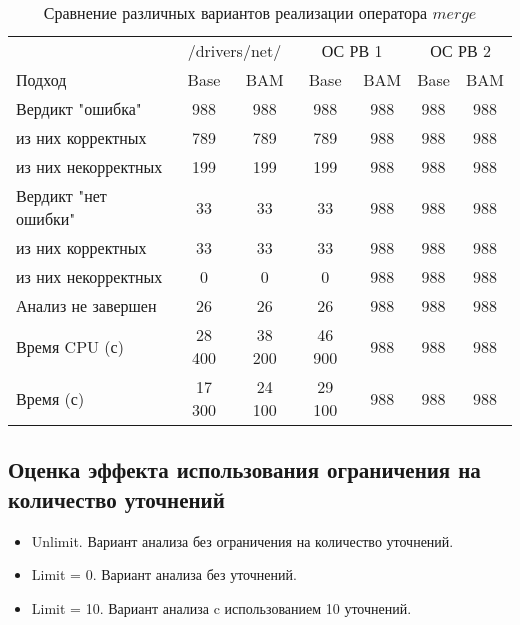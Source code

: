 \begin{center}
  \begin{table}[h]\footnotesize
  	\label{table-drivers-lock-refinement}
    \caption{Сравнение различных вариантов реализации оператора $merge$}
    \begin{tabular}{ | l | c | c | c | c | c | c |}
      \hline
      		& 		 \multicolumn{2}{|c|}{/drivers/net/} & 		 \multicolumn{2}{|c|}{ОС РВ 1} & 		 \multicolumn{2}{|c|}{ОС РВ 2} \\
      Подход         				& Base  & BAM 	& Base  	& BAM 	& Base   & BAM \\ \hline
      Вердикт "ошибка" 				& 988   & 988   & 988   	& 988   & 988    & 988  \\ 
  \hspace{0.5cm} из них корректных 	& 789 	& 789 	& 789   	& 988  	& 988    & 988 \\ 
  \hspace{0.5cm} из них некорректных & 199	& 199 	& 199   	& 988   & 988    & 988  \\ \hline
      Вердикт "нет ошибки"  		& 33    & 33    & 33   		& 988  	& 988    & 988   \\ 
  \hspace{0.5cm} из них корректных 	& 33 	& 33    & 33   		& 988   & 988    & 988  \\
  \hspace{0.5cm} из них некорректных & 0 	& 0    	& 0    		& 988  	& 988    & 988 \\ \hline
      Анализ не завершен       		& 26    & 26    & 26   		& 988   & 988    & 988\\ \hline
      Время CPU (с)   				& 28 400 & 38 200 & 46 900  & 988   & 988    & 988\\ 
      Время (с)  					& 17 300 & 24 100 & 29 100  & 988  	& 988    & 988   \\
      \hline
    \end{tabular}
  \end{table}
\end{center}

\subsection{Оценка эффекта использования ограничения на количество уточнений}

\begin{itemize}
\item Unlimit. Вариант анализа без ограничения на количество уточнений.
\item Limit = 0. Вариант анализа без уточнений.
\item Limit = 10. Вариант анализа c использованием 10 уточнений.
\end{itemize}

